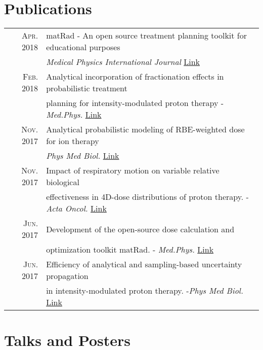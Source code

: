 \documentclass[a4paper,10pt]{article}
\begin{document}
\vspace{0.5cm}

\section{Publications}

\begin{tabular}{rl}
\textsc{Apr.} 2018 & matRad - An open source treatment planning toolkit for educational purposes\\
& \emph{Medical Physics International Journal} \href{http://www.mpijournal.org/pdf/2018-01/MPI-2018-01-p119.pdf}{Link}\\
\textsc{Feb.} 2018 & Analytical incorporation of fractionation effects in probabilistic treatment\\
& planning for intensity-modulated proton therapy  -\emph{ Med.Phys.} \href{https://www.ncbi.nlm.nih.gov/pubmed/29393506}{Link}\\
\textsc{Nov.} 2017 & Analytical probabilistic modeling of RBE-weighted dose for ion therapy \\
& \emph{Phys Med Biol.} \href{https://www.ncbi.nlm.nih.gov/pubmed/28980974}{Link}\\
\textsc{Nov.} 2017 & Impact of respiratory motion on variable relative biological \\
&effectiveness in 4D-dose distributions of proton therapy. -\emph{Acta Oncol.} \href{https://www.ncbi.nlm.nih.gov/pubmed/28828913}{Link}\\
\textsc{Jun.} 2017 & Development of the open-source dose calculation and \\
& optimization toolkit matRad. -\emph{ Med.Phys.} \href{https://www.ncbi.nlm.nih.gov/pubmed/28370020}{Link}\\
\textsc{Jun.} 2017 & Efficiency of analytical and sampling-based uncertainty propagation \\
& in intensity-modulated proton therapy. -\emph{Phys Med Biol.} \href{https://www.ncbi.nlm.nih.gov/pubmed/28370020}{Link}\\
\end{tabular}

\section{Talks and Posters}
\end{document}
